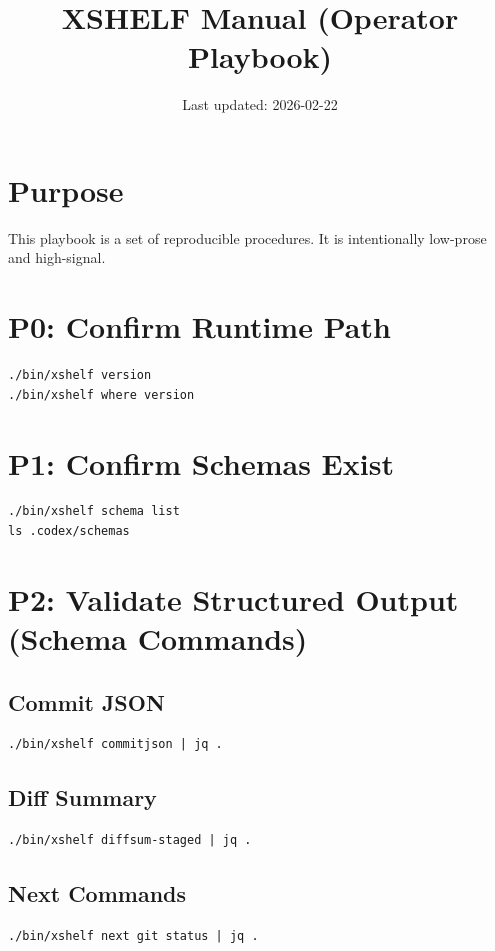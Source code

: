 \documentclass[11pt]{article}
\title{XSHELF Manual (Operator Playbook)}
\author{}
\date{Last updated: 2026-02-22}
\begin{document}
\maketitle
\vspace{-0.6em}

\section*{Purpose}
This playbook is a set of reproducible procedures. It is intentionally low-prose and high-signal.

\section{P0: Confirm Runtime Path}
\begin{lstlisting}[style=cx]
./bin/xshelf version
./bin/xshelf where version
\end{lstlisting}

\section{P1: Confirm Schemas Exist}
\begin{lstlisting}[style=cx]
./bin/xshelf schema list
ls .codex/schemas
\end{lstlisting}

\section{P2: Validate Structured Output (Schema Commands)}
\subsection*{Commit JSON}
\begin{lstlisting}[style=cx]
./bin/xshelf commitjson | jq .
\end{lstlisting}

\subsection*{Diff Summary}
\begin{lstlisting}[style=cx]
./bin/xshelf diffsum-staged | jq .
\end{lstlisting}

\subsection*{Next Commands}
\begin{lstlisting}[style=cx]
./bin/xshelf next git status | jq .
\end{lstlisting}
\end{document}
